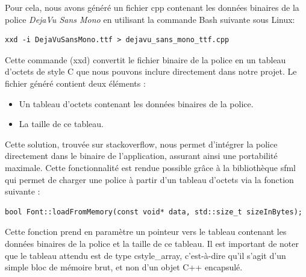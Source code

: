 Pour cela, nous avons généré un fichier \gls{cpp} contenant les données binaires de la police \textit{DejaVu Sans Mono} en utilisant la commande Bash suivante sous Linux:
\begin{lstlisting}[style=BashStyle,label={lst:generation_dejavusansmonottf_h}]
xxd -i DejaVuSansMono.ttf > dejavu_sans_mono_ttf.cpp
\end{lstlisting}
Cette commande (\gls{xxd}) convertit le fichier binaire de la police en un tableau d'octets de style C que nous pouvons inclure directement dans notre projet.
Le fichier généré contient deux éléments :
\begin{itemize}
    \item Un tableau d'octets contenant les données binaires de la police.
    \item La taille de ce tableau.
\end{itemize}

Cette solution, trouvée sur \gls{stackoverflow}\cite{stackoverflow_embed_font}, nous permet d'intégrer la police directement dans le binaire de l'application, assurant ainsi une portabilité maximale.
Cette fonctionnalité est rendue possible grâce à la bibliothèque \gls{sfml} qui permet de charger une police à partir d'un tableau d'octets via la fonction suivante :

\begin{lstlisting}[style=CStyle,label={lst:load_from_memory}]
bool Font::loadFromMemory(const void* data, std::size_t sizeInBytes);
\end{lstlisting}

Cette fonction prend en paramètre un pointeur vers le tableau contenant les données binaires de la police et la taille de ce tableau.
Il est important de noter que le tableau attendu est de type \gls{cstyle_array}, c'est-à-dire qu'il s'agit d'un simple bloc de mémoire brut, et non d'un objet C++ encapsulé.

